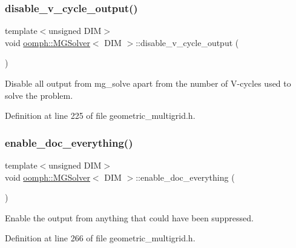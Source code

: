\subsubsection{\texorpdfstring{disable\+\_\+v\+\_\+cycle\+\_\+output()}{disable\_v\_cycle\_output()}}
{\footnotesize\ttfamily template$<$unsigned D\+IM$>$ \\
void \hyperlink{classoomph_1_1MGSolver}{oomph\+::\+M\+G\+Solver}$<$ D\+IM $>$\+::disable\+\_\+v\+\_\+cycle\+\_\+output (\begin{DoxyParamCaption}{ }\end{DoxyParamCaption})\hspace{0.3cm}{\ttfamily [inline]}}



Disable all output from mg\+\_\+solve apart from the number of V-\/cycles used to solve the problem. 



Definition at line 225 of file geometric\+\_\+multigrid.\+h.

\mbox{\label{classoomph_1_1MGSolver_ac1e06a4689b41bbb9a05ba9a0eecdb23}} 
\subsubsection{\texorpdfstring{enable\+\_\+doc\+\_\+everything()}{enable\_doc\_everything()}}
{\footnotesize\ttfamily template$<$unsigned D\+IM$>$ \\
void \hyperlink{classoomph_1_1MGSolver}{oomph\+::\+M\+G\+Solver}$<$ D\+IM $>$\+::enable\+\_\+doc\+\_\+everything (\begin{DoxyParamCaption}{ }\end{DoxyParamCaption})\hspace{0.3cm}{\ttfamily [inline]}}



Enable the output from anything that could have been suppressed. 



Definition at line 266 of file geometric\+\_\+multigrid.\+h.

\mbox{\label{classoomph_1_1MGSolver_abf5d8dc2a2a116a41bb625e1d6985f2e}} 

